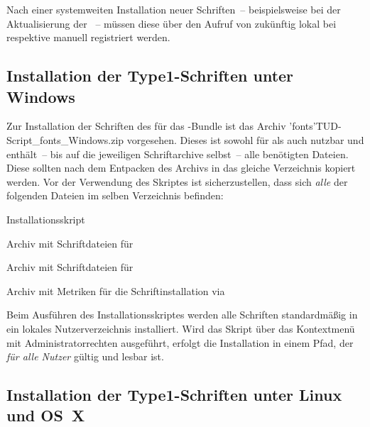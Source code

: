 Nach einer systemweiten Installation neuer Schriften~-- beispielsweise bei der 
Aktualisierung der \Distro~-- müssen diese über den Aufruf von  
zukünftig lokal bei \TeXLive respektive \MacTeX manuell registriert werden.



\subsection{%
  Installation der Type1-Schriften unter Windows%
  \label{sec:install:win}%
}

Zur Installation der Schriften des \CDs für das \TUDScript-Bundle ist das 
Archiv \GitHubFile*'fonts'{TUD-Script_fonts_Windows.zip} vorgesehen. Dieses 
ist sowohl für \TeXLive als auch \MiKTeX nutzbar und enthält~-- bis auf die 
jeweiligen Schriftarchive selbst~-- alle benötigten Dateien. Diese sollten nach 
dem Entpacken des Archivs in das gleiche Verzeichnis kopiert werden. Vor der 
Verwendung des Skriptes  ist sicherzustellen, 
dass sich \emph{alle} der folgenden Dateien im selben Verzeichnis befinden:
%
\settowidth{}%
\begin{description}[labelwidth=\tudscrdim,labelsep=.5em]
  \item[\File*{tudscr_fonts_install.bat}]Installationsskript
  \item[\File*{Univers_PS.zip}]Archiv mit Schriftdateien für \Univers
  \item[\File*{DIN_Bd_PS.zip}]Archiv mit Schriftdateien für \DIN
  \item[\File*{tudscr_fonts_install.zip}]Archiv mit Metriken für die
    Schriftinstallation via 
\end{description}
%
Beim Ausführen des Installationsskriptes werden alle Schriften standardmäßig in 
ein lokales Nutzerverzeichnis installiert. Wird das Skript über das Kontextmenü 
mit Administratorrechten ausgeführt, erfolgt die Installation in einem Pfad, 
der \emph{für alle Nutzer} gültig und lesbar ist.



\subsection{%
  Installation der Type1-Schriften unter Linux und OS~X%
  \label{sec:install:unix}%
}

